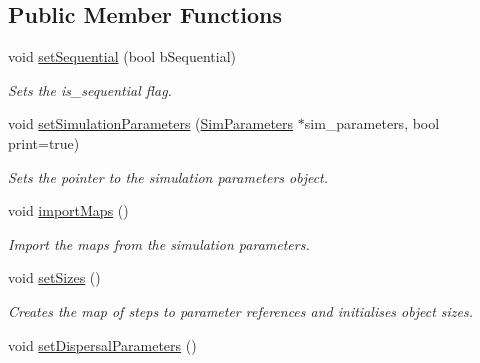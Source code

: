 \subsection*{Public Member Functions}
\begin{DoxyCompactItemize}
\item 
void \hyperlink{class_simulate_dispersal_a3da09319132db8c7ad035290be6590ef}{set\+Sequential} (bool b\+Sequential)
\begin{DoxyCompactList}\small\item\em Sets the is\+\_\+sequential flag. \end{DoxyCompactList}\item 
void \hyperlink{class_simulate_dispersal_a9d08a14b3f2a78591af2edf2884edb52}{set\+Simulation\+Parameters} (\hyperlink{struct_sim_parameters}{Sim\+Parameters} $\ast$sim\+\_\+parameters, bool print=true)
\begin{DoxyCompactList}\small\item\em Sets the pointer to the simulation parameters object. \end{DoxyCompactList}\item 
void \hyperlink{class_simulate_dispersal_a275eef6872de493273fc047467935d7b}{import\+Maps} ()\hypertarget{class_simulate_dispersal_a275eef6872de493273fc047467935d7b}{}\label{class_simulate_dispersal_a275eef6872de493273fc047467935d7b}

\begin{DoxyCompactList}\small\item\em Import the maps from the simulation parameters. \end{DoxyCompactList}\item 
void \hyperlink{class_simulate_dispersal_a7aeeb01c40f5de7f88bce2b484bf83a0}{set\+Sizes} ()\hypertarget{class_simulate_dispersal_a7aeeb01c40f5de7f88bce2b484bf83a0}{}\label{class_simulate_dispersal_a7aeeb01c40f5de7f88bce2b484bf83a0}

\begin{DoxyCompactList}\small\item\em Creates the map of steps to parameter references and initialises object sizes. \end{DoxyCompactList}\item 
void \hyperlink{class_simulate_dispersal_a4acdae18451d1e9f67c005390b89664f}{set\+Dispersal\+Parameters} ()\hypertarget{class_simulate_dispersal_a4acdae18451d1e9f67c005390b89664f}{}\label{class_simulate_dispersal_a4acdae18451d1e9f67c005390b89664f}


\end{DoxyCompactItemize}
